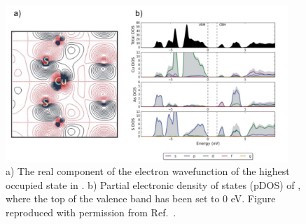 \documentclass[11pt, twoside]{report}
\begin{document}
\begin{figure}[h!]
    \centering
    \includegraphics[width=0.95\textwidth]{figures/enargite_bonding.png}
    \caption[a) The real component of the electron wavefunction of the highest occupied state in {\enargite}. b) Partial electronic density of states (pDOS) of {\enargite}, where the top of the valence band has been set to 0 eV.]{a) The real component of the electron wavefunction of the highest occupied state in {\enargite}. b) Partial electronic density of states (pDOS) of {\enargite}, where the top of the valence band has been set to 0 eV. Figure reproduced with permission from Ref.~.}
    \label{enargite_bonding}
\end{figure}
\end{document}
